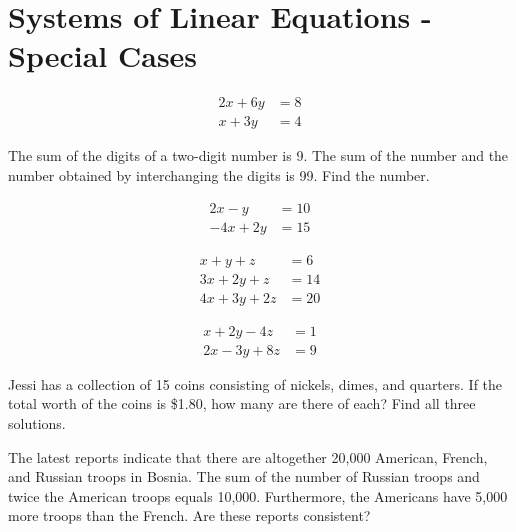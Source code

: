 \section{Systems of Linear Equations - Special Cases}

\begin{puzzle}
    \begin{align*}
        2x + 6y & = 8 \\
        x + 3y  & = 4
    \end{align*}
\end{puzzle}

\begin{puzzle}
    The sum of the digits of a two-digit number is 9. The sum of the number and the number obtained by interchanging the digits is 99. Find the number.
\end{puzzle}

\begin{puzzle}
    \begin{align*}
        2x - y   & = 10 \\
        -4x + 2y & = 15
    \end{align*}
\end{puzzle}

\begin{puzzle}
    \begin{align*}
        x + y + z    & = 6  \\
        3x + 2y + z  & = 14 \\
        4x + 3y + 2z & = 20
    \end{align*}
\end{puzzle}

\begin{puzzle}
    \begin{align*}
        x + 2y - 4z  & = 1 \\
        2x - 3y + 8z & = 9
    \end{align*}
\end{puzzle}

\begin{puzzle}
    Jessi has a collection of 15 coins consisting of nickels, dimes, and quarters. If the total worth of the coins is \$1.80, how many are there of each? Find all three solutions.
\end{puzzle}

\begin{puzzle}
    The latest reports indicate that there are altogether 20,000 American, French, and Russian troops in Bosnia. The sum of the number of Russian troops and twice the American troops equals 10,000. Furthermore, the Americans have 5,000 more troops than the French. Are these reports consistent?
\end{puzzle}

